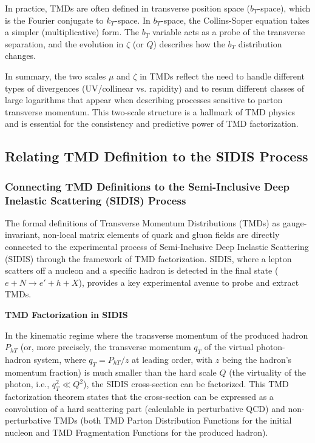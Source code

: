 \documentclass[11pt]{article}
\begin{document}
In practice, TMDs are often defined in transverse position space ($b_T$-space), which is the Fourier conjugate to $k_T$-space. In $b_T$-space, the
Collins-Soper equation takes a simpler (multiplicative) form. The $b_T$ variable acts as a probe of the transverse separation, and the evolution in
$\zeta$ (or $Q$) describes how the $b_T$ distribution changes.

In summary, the two scales $\mu$ and $\zeta$ in TMDs reflect the need to handle different types of divergences (UV/collinear vs. rapidity) and to
resum different classes of large logarithms that appear when describing processes sensitive to parton transverse momentum. This two-scale structure
is a hallmark of TMD physics and is essential for the consistency and predictive power of TMD factorization.

\subsection{Relating TMD Definition to the SIDIS Process}

\subsubsection{Connecting TMD Definitions to the Semi-Inclusive Deep Inelastic Scattering (SIDIS) Process}

The formal definitions of Transverse Momentum Distributions (TMDs) as gauge-invariant, non-local matrix elements of quark and gluon fields are
directly connected to the experimental process of Semi-Inclusive Deep Inelastic Scattering (SIDIS) through the framework of TMD factorization. SIDIS,
where a lepton scatters off a nucleon and a specific hadron is detected in the final state ($e + N \rightarrow e' + h + X$), provides a key
experimental avenue to probe and extract TMDs.

\textbf{TMD Factorization in SIDIS}

In the kinematic regime where the transverse momentum of the produced hadron $P_{hT}$ (or, more precisely, the transverse momentum $q_T$ of the
virtual photon-hadron system, where $q_T = P_{hT}/z$ at leading order, with $z$ being the hadron's momentum fraction) is much smaller than the hard
scale $Q$ (the virtuality of the photon, i.e., $q_T^2 \ll Q^2$), the SIDIS cross-section can be factorized. This TMD factorization theorem states
that the cross-section can be expressed as a convolution of a hard scattering part (calculable in perturbative QCD) and non-perturbative TMDs (both
TMD Parton Distribution Functions for the initial nucleon and TMD Fragmentation Functions for the produced hadron).
\end{document}

